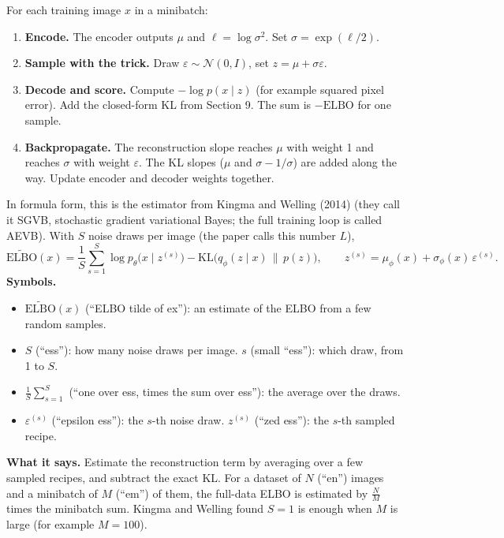 For each training image $x$ in a minibatch:
\begin{enumerate}[leftmargin=1.5em]
\item \textbf{Encode.} The encoder outputs $\mu$ and $\ell = \log\sigma^2$. Set $\sigma = \exp(\ell/2)$.
\item \textbf{Sample with the trick.} Draw $\varepsilon \sim \mathcal{N}(0, I)$, set $z = \mu + \sigma\varepsilon$.
\item \textbf{Decode and score.} Compute $-\log p(x \mid z)$ (for example squared pixel error). Add the closed-form KL from Section 9. The sum is $-\mathrm{ELBO}$ for one sample.
\item \textbf{Backpropagate.} The reconstruction slope reaches $\mu$ with weight 1 and reaches $\sigma$ with weight $\varepsilon$. The KL slopes ($\mu$ and $\sigma - 1/\sigma$) are added along the way. Update encoder and decoder weights together.
\end{enumerate}
In formula form, this is the estimator from Kingma and Welling (2014) (they call it SGVB, stochastic gradient variational Bayes; the full training loop is called AEVB). With $S$ noise draws per image (the paper calls this number $L$),
\[
\widetilde{\mathrm{ELBO}}(x) = \frac{1}{S}\sum_{s=1}^{S}\log p_\theta\big(x \mid z^{(s)}\big) - \mathrm{KL}\big(q_\phi(z \mid x)\,\|\,p(z)\big),
\qquad z^{(s)} = \mu_\phi(x) + \sigma_\phi(x)\,\varepsilon^{(s)}.
\]
\textbf{Symbols.}
\begin{itemize}[leftmargin=1.5em, itemsep=0pt]
\item $\widetilde{\mathrm{ELBO}}(x)$ (``ELBO tilde of ex''): an estimate of the ELBO from a few random samples.
\item $S$ (``ess''): how many noise draws per image. $s$ (small ``ess''): which draw, from 1 to $S$.
\item $\frac{1}{S}\sum_{s=1}^{S}$ (``one over ess, times the sum over ess''): the average over the draws.
\item $\varepsilon^{(s)}$ (``epsilon ess''): the $s$-th noise draw. $z^{(s)}$ (``zed ess''): the $s$-th sampled recipe.
\end{itemize}
\textbf{What it says.} Estimate the reconstruction term by averaging over a few sampled recipes, and subtract the exact KL. For a dataset of $N$ (``en'') images and a minibatch of $M$ (``em'') of them, the full-data ELBO is estimated by $\tfrac{N}{M}$ times the minibatch sum. Kingma and Welling found $S = 1$ is enough when $M$ is large (for example $M = 100$).

